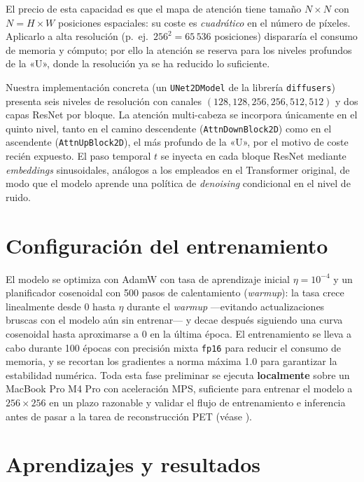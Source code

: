 El precio de esta capacidad es que el mapa de atención tiene tamaño
$N \times N$ con $N = H \times W$ posiciones espaciales: su coste es
\emph{cuadrático} en el número de píxeles. Aplicarlo a alta resolución
(p.~ej.\ $256^2 = 65\,536$ posiciones) dispararía el consumo de
memoria y cómputo; por ello la atención se reserva para los niveles
profundos de la «U», donde la resolución ya se ha reducido lo
suficiente.

Nuestra implementación concreta (un \texttt{UNet2DModel} de la
librería \texttt{diffusers}) presenta seis niveles de
resolución con canales $(128, 128, 256, 256, 512, 512)$ y dos
capas ResNet por bloque. La atención multi-cabeza se incorpora
únicamente en el quinto nivel, tanto en el camino descendente
(\texttt{AttnDownBlock2D}) como en el ascendente
(\texttt{AttnUpBlock2D}), el más profundo de la «U», por el motivo
de coste recién expuesto. El paso temporal $t$ se inyecta en cada
bloque ResNet mediante \textit{embeddings} sinusoidales, análogos a
los empleados en el Transformer original, de modo que el modelo
aprende una política de \textit{denoising} condicional en el nivel
de ruido.

\section{Configuración del entrenamiento}
\label{sec:mariposas-config}

El modelo se optimiza con AdamW con tasa de aprendizaje inicial
$\eta = 10^{-4}$ y un planificador cosenoidal con 500 pasos de
calentamiento (\textit{warmup}): la tasa crece linealmente desde 0
hasta $\eta$ durante el \textit{warmup} ---evitando actualizaciones
bruscas con el modelo aún sin entrenar--- y decae después siguiendo una
curva cosenoidal hasta aproximarse a 0 en la última época. El
entrenamiento se lleva a cabo
durante 100 épocas con precisión mixta \texttt{fp16} para reducir
el consumo de memoria, y se recortan los gradientes a norma
máxima 1.0 para garantizar la estabilidad numérica. Toda esta
fase preliminar se ejecuta \textbf{localmente} sobre un MacBook
Pro M4 Pro con aceleración MPS, suficiente para entrenar el
modelo a $256 \times 256$ en un plazo razonable y validar el
flujo de entrenamiento e inferencia antes de pasar a la tarea de
reconstrucción PET (véase ).

\section{Aprendizajes y resultados}
\label{sec:mariposas-aprendizajes}

